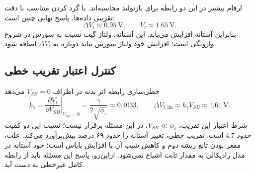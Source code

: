 ارقام بیشتر در این دو رابطه برای بازتولید محاسبه‌اند.
با گرد کردن متناسب با دقت تقریبی داده‌ها، پاسخ نهایی چنین است:
\begin{equation}
 \boxed{\Delta V_t\approx\qty{0.95}{\volt},\qquad V_t\approx\qty{1.65}{\volt}.}
 \label{eq:numeric-body-result}
\end{equation}
بنابراین آستانه افزایش می‌یابد.
این آستانه، ولتاژ گیت نسبت به سورس در شروع وارونگی است؛ افزایش خود ولتاژ سورس نباید دوباره به \(\Delta V_t\) اضافه شود.

\subsection*{کنترل اعتبار تقریب خطی}
خطی‌سازی رابطه اثر بدنه در اطراف \(V_{SB}=0\) می‌دهد
\cite[رابطه ]{weste}\cite[اسلاید ۱۷]{nonideal}
\begin{equation}
 k_\gamma=\left.\frac{\partial V_t}{\partial V_{SB}}\right|_{V_{SB}=0}
 =\frac{\gamma}{2\sqrt{\phi_s}}\approx0.4033,
 \qquad \Delta V_{t,\mathrm{lin}}\approx k_\gamma V_{SB}\approx\qty{1.61}{\volt}.
 \label{eq:numeric-linear-check}
\end{equation}
شرط اعتبار این تقریب، \(V_{SB}\ll\phi_s\)، در این مسئله برقرار نیست؛ نسبت این دو کمیت حدود \num{4.7} است.
تقریب خطی، تغییر آستانه را حدود ۶۹ درصد بیش‌برآورد می‌کند.
علت، مقعر بودن تابع ریشه دوم و کاهش شیب آن با افزایش بایاس است؛ خود آستانه در مدل رادیکالی به مقدار ثابت اشباع نمی‌شود.
ازاین‌رو، پاسخ این مسئله باید از رابطه کامل غیرخطی به دست آید.
